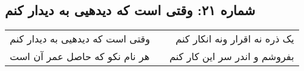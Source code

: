 \begin{center}
\section*{شماره ۲۱: وقتی است که دیدهیی به دیدار کنم}
\label{sec:021}
\begin{longtable}{l p{0.5cm} r}
وقتی است که دیدهیی به دیدار کنم
&&
یک ذره نه اقرار ونه انکار کنم
\\
هر نام نکو که حاصل عمر آن است
&&
بفروشم و اندر سر این کار کنم
\\
\end{longtable}
\end{center}

